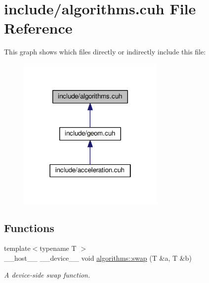\hypertarget{cuda_tracer__0__1_2include_2algorithms_8cuh}{}\section{include/algorithms.cuh File Reference}
\label{cuda_tracer__0__1_2include_2algorithms_8cuh}
This graph shows which files directly or indirectly include this file\+:
\nopagebreak
\begin{figure}[H]
\begin{center}
\leavevmode
\includegraphics[width=202pt]{cuda_tracer__0__1_2include_2algorithms_8cuh__dep__incl}
\end{center}
\end{figure}
\subsection*{Functions}
\begin{DoxyCompactItemize}
\item 
{\footnotesize template$<$typename T $>$ }\\\+\_\+\+\_\+host\+\_\+\+\_\+ \+\_\+\+\_\+device\+\_\+\+\_\+ void \hyperlink{group__auxiliary__algorithms_ga8bffe5209ec351179a96aed81aab0978}{algorithms\+::swap} (T \&a, T \&b)
\begin{DoxyCompactList}\small\item\em A device-\/side swap function. \end{DoxyCompactList}\end{DoxyCompactItemize}
